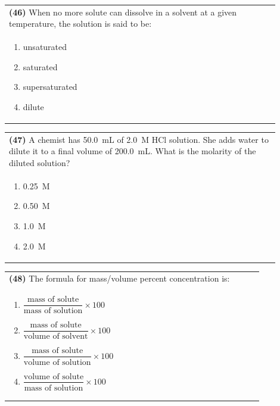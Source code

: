 \documentclass{article}
\begin{document}
\noindent\begin{tabular}{|p{0.9\linewidth}|}
\hline
\textbf{(46)} When no more solute can dissolve in a solvent at a given temperature, the solution is said to be:\\[0.2cm]
\begin{minipage}[t]{0.85\linewidth}
\begin{enumerate}[label=\alph*.]
\item unsaturated
\item saturated
\item supersaturated
\item dilute
\end{enumerate}
\end{minipage}\\[0.2cm]
\hline
\end{tabular}

\noindent\begin{tabular}{|p{0.9\linewidth}|}
\hline
\textbf{(47)} A chemist has 50.0~mL of 2.0~M HCl solution. She adds water to dilute it to a final volume of 200.0~mL. What is the molarity of the diluted solution?\\[0.2cm]
\begin{minipage}[t]{0.85\linewidth}
\begin{enumerate}[label=\alph*.]
\item 0.25~M
\item 0.50~M
\item 1.0~M
\item 2.0~M
\end{enumerate}
\end{minipage}\\[0.2cm]
\hline
\end{tabular}

\noindent\begin{tabular}{|p{0.9\linewidth}|}
\hline
\textbf{(48)} The formula for mass/volume percent concentration is:\\[0.2cm]
\begin{minipage}[t]{0.85\linewidth}
\begin{enumerate}[label=\alph*.]
\item $\dfrac{\text{mass of solute}}{\text{mass of solution}} \times 100$
\item $\dfrac{\text{mass of solute}}{\text{volume of solvent}} \times 100$
\item $\dfrac{\text{mass of solute}}{\text{volume of solution}} \times 100$
\item $\dfrac{\text{volume of solute}}{\text{mass of solution}} \times 100$
\end{enumerate}
\end{minipage}\\[0.2cm]
\hline
\end{tabular}
\newpage
\end{document}
